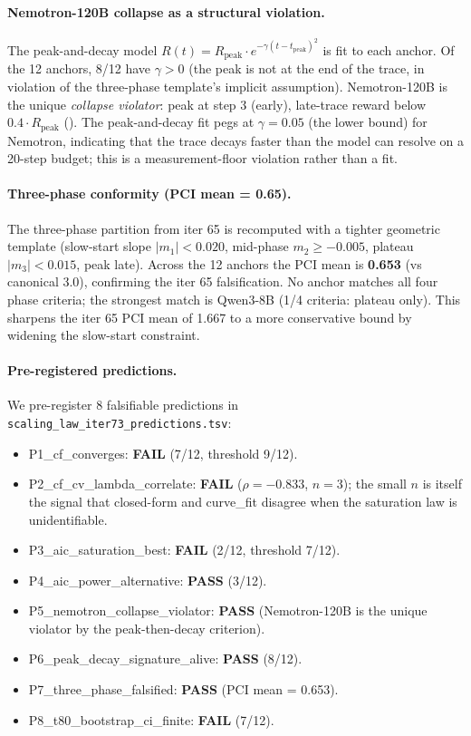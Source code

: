 \paragraph{Nemotron-120B collapse as a structural violation.}
\label{par:scaling-iter73-nemotron}
The peak-and-decay model
$R(t) = R_\mathrm{peak} \cdot e^{-\gamma (t - t_\mathrm{peak})^2}$
is fit to each anchor.  Of the 12 anchors, 8/12 have
$\gamma > 0$ (the peak is not at the end of the trace, in
violation of the three-phase template's implicit assumption).
Nemotron-120B is the unique \emph{collapse violator}: peak at
step 3 (early), late-trace reward below $0.4 \cdot R_\mathrm{peak}$
().  The peak-and-decay fit
pegs at $\gamma = 0.05$ (the lower bound) for Nemotron,
indicating that the trace decays faster than the model can
resolve on a 20-step budget; this is a measurement-floor
violation rather than a fit.

\paragraph{Three-phase conformity (PCI mean = 0.65).}
\label{par:scaling-iter73-pci}
The three-phase partition from iter 65 is recomputed with a
tighter geometric template (slow-start slope $|m_1| < 0.020$,
mid-phase $m_2 \geq -0.005$, plateau $|m_3| < 0.015$, peak
late).  Across the 12 anchors the PCI mean is
\textbf{0.653} (vs canonical 3.0), confirming the iter 65
falsification.  No anchor matches all four phase criteria;
the strongest match is Qwen3-8B (1/4 criteria: plateau only).
This sharpens the iter 65 PCI mean of 1.667 to a more
conservative bound by widening the slow-start constraint.

\paragraph{Pre-registered predictions.}
\label{par:scaling-iter73-preds}
We pre-register 8 falsifiable predictions in
\texttt{scaling\_law\_iter73\_predictions.tsv}:
\begin{itemize}
  \item P1\_cf\_converges: \textbf{FAIL} (7/12, threshold 9/12).
  \item P2\_cf\_cv\_lambda\_correlate: \textbf{FAIL}
        ($\rho = -0.833$, $n=3$); the small $n$ is itself the
        signal that closed-form and curve\_fit disagree when
        the saturation law is unidentifiable.
  \item P3\_aic\_saturation\_best: \textbf{FAIL} (2/12, threshold 7/12).
  \item P4\_aic\_power\_alternative: \textbf{PASS} (3/12).
  \item P5\_nemotron\_collapse\_violator: \textbf{PASS}
        (Nemotron-120B is the unique violator by the
        peak-then-decay criterion).
  \item P6\_peak\_decay\_signature\_alive: \textbf{PASS} (8/12).
  \item P7\_three\_phase\_falsified: \textbf{PASS} (PCI mean = 0.653).
  \item P8\_t80\_bootstrap\_ci\_finite: \textbf{FAIL} (7/12).
\end{itemize}

